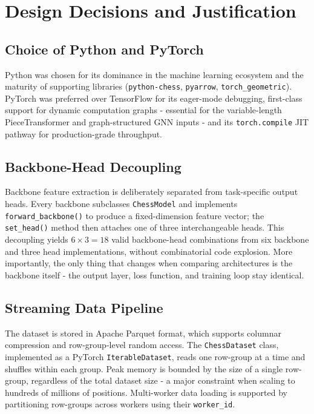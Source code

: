 
\section{Design Decisions and Justification}

\subsection{Choice of Python and PyTorch}
Python was chosen for its dominance in the machine learning ecosystem and the maturity of supporting libraries (\texttt{python-chess}, \texttt{pyarrow}, \texttt{torch\_geometric}). PyTorch was preferred over TensorFlow for its eager-mode debugging, first-class support for dynamic computation graphs - essential for the variable-length PieceTransformer and graph-structured GNN inputs - and its \texttt{torch.compile} JIT pathway for production-grade throughput.


\subsection{Backbone-Head Decoupling}
Backbone feature extraction is deliberately separated from task-specific output heads. Every backbone subclasses \texttt{ChessModel} and implements \texttt{forward\_backbone()} to produce a fixed-dimension feature vector; the \texttt{set\_head()} method then attaches one of three interchangeable heads. This decoupling yields $6 \times 3 = 18$ valid backbone-head combinations from six backbone and three head implementations, without combinatorial code explosion. More importantly, the only thing that changes when comparing architectures is the backbone itself - the output layer, loss function, and training loop stay identical.

\subsection{Streaming Data Pipeline}
The dataset is stored in Apache Parquet format, which supports columnar compression and row-group-level random access. The \texttt{ChessDataset} class, implemented as a PyTorch \texttt{IterableDataset}, reads one row-group at a time and shuffles within each group. Peak memory is bounded by the size of a single row-group, regardless of the total dataset size - a major constraint when scaling to hundreds of millions of positions. Multi-worker data loading is supported by partitioning row-groups across workers using their \texttt{worker\_id}.

